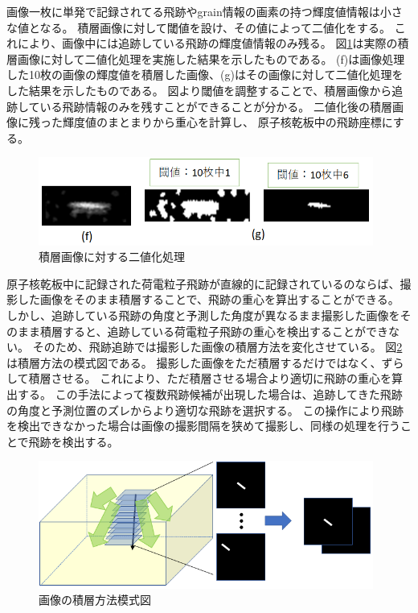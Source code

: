 \documentclass[12pt,a4paper]{jarticle}
\begin{document}
画像一枚に単発で記録されてる飛跡やgrain情報の画素の持つ輝度値情報は小さな値となる。
積層画像に対して閾値を設け、その値によって二値化をする。
これにより、画像中には追跡している飛跡の輝度値情報のみ残る。
図\ref{fig:sekisou_nitika}は実際の積層画像に対して二値化処理を実施した結果を示したものである。
(f)は画像処理した10枚の画像の輝度値を積層した画像、(g)はその画像に対して二値化処理をした結果を示したものである。
図より閾値を調整することで、積層画像から追跡している飛跡情報のみを残すことができることが分かる。
二値化後の積層画像に残った輝度値のまとまりから重心を計算し、
原子核乾板中の飛跡座標にする。
\begin{figure}[htbp]
  \centering
     \includegraphics[width=110mm]{tuiseki_gazou2.png}
  \caption{積層画像に対する二値化処理\label{fig:sekisou_nitika}}
\end{figure}
\par
原子核乾板中に記録された荷電粒子飛跡が直線的に記録されているのならば、撮影した画像をそのまま積層することで、飛跡の重心を算出することができる。
しかし、追跡している飛跡の角度と予測した角度が異なるまま撮影した画像をそのまま積層すると、追跡している荷電粒子飛跡の重心を検出することができない。
そのため、飛跡追跡では撮影した画像の積層方法を変化させている。
図\ref{fig:sekisou_mosikizu}は積層方法の模式図である。
撮影した画像をただ積層するだけではなく、ずらして積層させる。
これにより、ただ積層させる場合より適切に飛跡の重心を算出する。
この手法によって複数飛跡候補が出現した場合は、追跡してきた飛跡の角度と予測位置のズレからより適切な飛跡を選択する。
この操作により飛跡を検出できなかった場合は画像の撮影間隔を狭めて撮影し、同様の処理を行うことで飛跡を検出する。
\begin{figure}[htbp]
  \centering
     \includegraphics[width=110mm]{sekisou_step3.png}
  \caption{画像の積層方法模式図\label{fig:sekisou_mosikizu}}
\end{figure}
\end{document}
